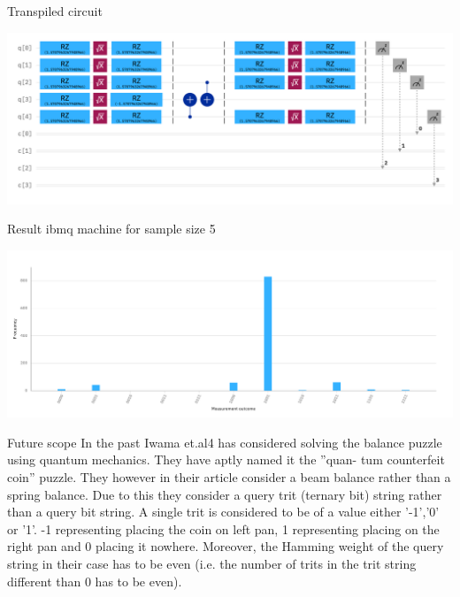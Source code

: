 \documentclass{beamer} %
\begin{document}
		\begin{frame}
			\begin{block}{Transpiled circuit}
				
			\end{block}
			\begin{center}
				\includegraphics[scale = 0.1]{Figures/transpiled-circuit.png}
			\end{center}
			
		\end{frame}
		\begin{frame}
			\begin{block}{Result ibmq  machine for sample size 5}
				
			\end{block}
			\begin{center}
				\includegraphics[scale = 0.1]{Figures/ibm_hist.png}
			\end{center}
	\end{frame}
	\begin{frame}
		\begin{block}{Future scope}
			In the past Iwama et.al4 has considered solving the balance puzzle using quantum mechanics. They have aptly named it the ”quan- tum counterfeit coin” puzzle. They however in their article consider a beam balance rather than a spring balance. Due to this they consider a query trit (ternary bit) string rather than a query bit string. A single trit is considered to be of a value either ’-1’,’0’ or ’1’. -1 representing placing the coin on left pan, 1 representing placing on the right pan and 0 placing it nowhere. Moreover, the Hamming weight of the query string in their case has to be even (i.e. the number of trits in the trit string different than 0 has to be even).
		\end{block}
	\end{frame}
\end{document}
